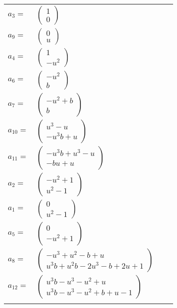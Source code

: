 \documentclass[1p]{elsarticle_modified}
\theoremstyle{definition}
\begin{document}
\begin{tabular}{m{7pt} m{180pt} m{7pt} m{180pt} }
\flushright $a_{3}=$&$\begin{pmatrix}1\\0\end{pmatrix}$ \\
\flushright $a_{9}=$&$\begin{pmatrix}0\\u\end{pmatrix}$ \\
\flushright $a_{4}=$&$\begin{pmatrix}1\\- u^2\end{pmatrix}$ \\
\flushright $a_{6}=$&$\begin{pmatrix}- u^2\\b\end{pmatrix}$ \\
\flushright $a_{7}=$&$\begin{pmatrix}- u^2+b\\b\end{pmatrix}$ \\
\flushright $a_{10}=$&$\begin{pmatrix}u^3- u\\- u^3 b+u\end{pmatrix}$ \\
\flushright $a_{11}=$&$\begin{pmatrix}- u^3 b+u^3- u\\- b u+u\end{pmatrix}$ \\
\flushright $a_{2}=$&$\begin{pmatrix}- u^2+1\\u^2-1\end{pmatrix}$ \\
\flushright $a_{1}=$&$\begin{pmatrix}0\\u^2-1\end{pmatrix}$ \\
\flushright $a_{5}=$&$\begin{pmatrix}0\\- u^2+1\end{pmatrix}$ \\
\flushright $a_{8}=$&$\begin{pmatrix}- u^3+u^2- b+u\\u^3 b+u^2 b-2 u^3- b+2 u+1\end{pmatrix}$ \\
\flushright $a_{12}=$&$\begin{pmatrix}u^3 b- u^3- u^2+u\\u^3 b- u^3- u^2+b+u-1\end{pmatrix}$\\&\end{tabular}
\end{document}
